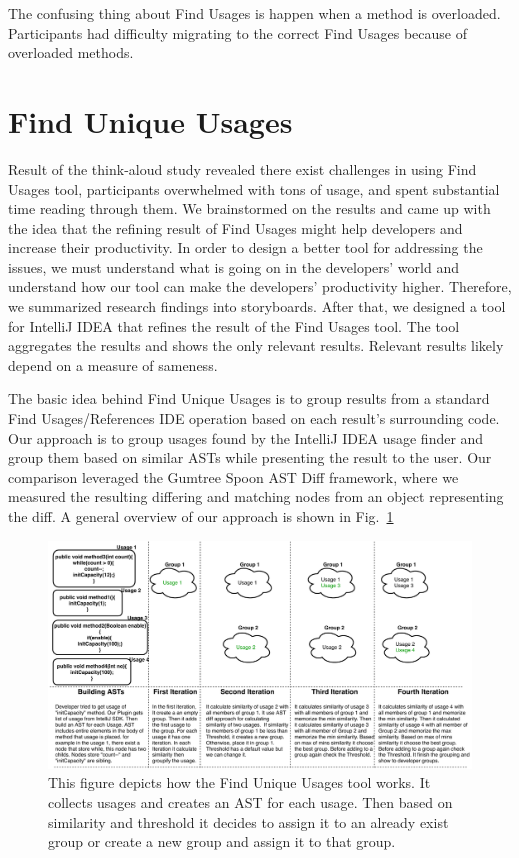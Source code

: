 \documentclass[conference]{IEEEtran}
\begin{document}
The confusing thing about Find Usages is happen when a method is overloaded. Participants had difficulty migrating to the correct Find Usages because of overloaded methods.

\section{Find Unique Usages}
Result of the think-aloud study revealed there exist challenges in using Find Usages tool, participants overwhelmed with tons of usage, and spent substantial time reading through them. We brainstormed on the results and came up with the idea that the refining result of Find Usages might help developers and increase their productivity. In order to design a better tool for addressing the issues, we must understand what is going on in the developers' world and understand how our tool can make the developers' productivity higher. Therefore, we summarized research findings into storyboards. After that, we designed a tool for IntelliJ IDEA that refines the result of the Find Usages tool. The tool aggregates the results and shows the only relevant results. Relevant results likely depend on a measure of sameness.\par
The basic idea behind Find Unique Usages is to group results from a standard Find Usages/References IDE operation based on each result's surrounding code. Our approach is to group usages found by the IntelliJ IDEA usage finder and group them based on similar ASTs while presenting the result to the user. Our comparison leveraged the Gumtree Spoon AST Diff framework, where we measured the resulting differing and matching nodes from an object representing the diff. A general overview of our approach is shown in Fig.~\ref{fig:general} 

\begin{figure}
    \centering
    \includegraphics [width=\textwidth,keepaspectratio,clip]{figures/generlView.pdf}
    \caption{This figure depicts how the Find Unique Usages tool works. It collects usages and creates an AST for each usage. Then based on similarity and threshold it decides to assign it to an already exist group or create a new group and assign it to that group. }
\label{fig:general}
\end{figure}
\end{document}
